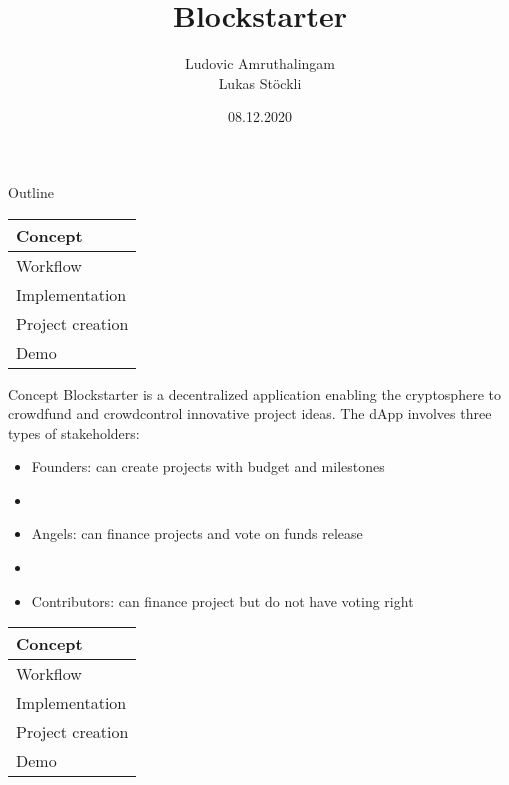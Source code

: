 \documentclass{beamer}
\title              {Blockstarter}
\author             {Ludovic Amruthalingam\\Lukas Stöckli}
\institute          {University of Basel}
\date               {08.12.2020}
\begin{document}
\begin{frame}[t,plain]
	\titlepage
\end{frame}




\begin{frame}{Outline}
	\begin{tabularx}{\textwidth}{X}
		\hline
		\rowcolor{hcolor}
		Concept\\
		\hline
		Workflow\\
		\hline
		Implementation\\
		\hline
		Project creation\\
		\hline
		Demo\\
		\hline
	\end{tabularx}
\end{frame}




\begin{frame}{Concept}
Blockstarter is a decentralized application enabling the cryptosphere to crowdfund and crowdcontrol innovative project ideas. The dApp involves three types of stakeholders:\\
\vspace{7mm}
\begin{itemize}
	\item Founders: can create projects with budget and milestones
	\item[]
	\item Angels: can finance projects and vote on funds release
	\item[]
	\item Contributors: can finance project but do not have voting right
\end{itemize}
\end{frame}

\begin{frame}
	\begin{tabularx}{\textwidth}{X}
		\hline
		Concept\\
		\hline
		\rowcolor{hcolor}
		Workflow\\
		\hline
		Implementation\\
		\hline
		Project creation\\
		\hline
		Demo\\
		\hline
	\end{tabularx}
\end{frame}
\end{document}
